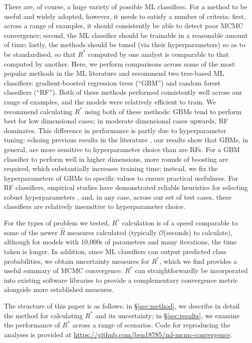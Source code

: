 \documentclass[ba]{imsart}
\numberwithin{equation}{section}
\theoremstyle{plain}
\begin{document}
	There are, of course, a huge variety of possible ML classifiers. For a method to be useful and widely adopted, however, it needs to satisfy a number of criteria: first, across a range of examples, it should consistently be able to detect poor MCMC convergence; second, the ML classifier should be trainable in a reasonable amount of time; lastly, the methods should be tuned (via their hyperparameters) so as to be standardised, so that $R^*$ computed by one analyst is comparable to that computed by another. Here, we perform comparisons across some of the most popular methods in the ML literature and recommend two tree-based ML classifiers: gradient-boosted regression trees \citep{friedman2001greedy,greenwell2019package} (``GBM'') and random forest classifiers \citep{breiman2001random} (``RF''). Both of these methods performed consistently well across our range of examples, and the models were relatively efficient to train. We recommend calculating $R^*$ using both of these methods: GBMs tend to perform best for low dimensional cases; in moderate dimensional cases upwards, RF dominates. This difference in performance is partly due to hyperparameter tuning: echoing previous results in the literature \cite[Chapters~11\&12]{boehmke2019hands}, our results show that GBMs, in general, are more sensitive to hyperparameter choice than are RFs. For a GBM classifier to perform well in higher dimensions, more rounds of boosting are required, which substantially increases training time; instead, we fix the hyperparameters of GBMs to specific values to ensure practical usefulness. For RF classifiers, empirical studies have demonstrated reliable heuristics for selecting robust hyperparameters \citep{bernard2009influence}, and, in any case, across our set of test cases, these classifiers are relatively insensitive to hyperparameter choice.
	
	For the types of problem we tested, $R^*$ calculation is of a speed comparable to some of the newer $\widehat{R}$ measures calculated (typically $\mathcal{O}$(seconds) to calculate), although for models with 10,000s of parameters and many iterations, the time taken is longer. In addition, since ML classifiers can output predicted class probabilities, we obtain uncertainty measures for $R^*$, which we find provides a useful summary of MCMC convergence. $R^*$ can straightforwardly be incorporated into existing software libraries to provide a complementary convergence metric alongside more established measures.
	
	The structure of this paper is as follows: in \S\ref{sec:method}, we describe in detail the method for calculating $R^*$ and its uncertainty; in \S\ref{sec:results}, we examine the performance of $R^*$ across a range of scenarios. Code for reproducing the analyses is provided at \url{https://github.com/ben18785/ml-mcmc-convergence}.
	
\end{document}
